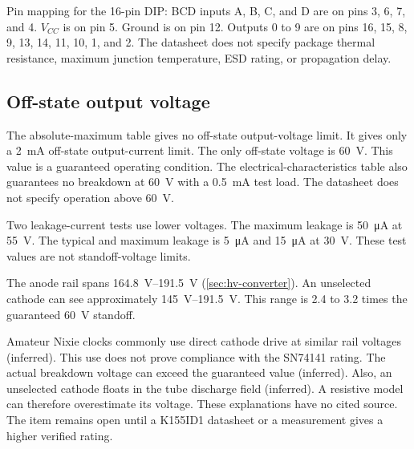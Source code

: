 Pin mapping for the 16-pin DIP: BCD inputs A, B, C, and D are on pins 3, 6, 7,
and 4. \(V_{CC}\) is on pin 5. Ground is on pin 12. Outputs 0 to 9 are on pins
16, 15, 8, 9, 13, 14, 11, 10, 1, and 2. The datasheet does not specify package
thermal resistance, maximum junction temperature, ESD rating, or propagation
delay.

\subsection{Off-state output voltage}
\label{sec:bcd-voltage-risk}

The absolute-maximum table gives no off-state output-voltage limit. It gives
only a \SI{2}{\milli\ampere} off-state output-current limit. The only off-state
voltage is \SI{60}{\volt}. This value is a guaranteed operating condition. The
electrical-characteristics table also guarantees no breakdown at
\SI{60}{\volt} with a \SI{0.5}{\milli\ampere} test load. The datasheet does not
specify operation above \SI{60}{\volt}.

Two leakage-current tests use lower voltages. The maximum leakage is
\SI{50}{\micro\ampere} at \SI{55}{\volt}. The typical and maximum leakage is
\SI{5}{\micro\ampere} and \SI{15}{\micro\ampere} at \SI{30}{\volt}. These test
values are not standoff-voltage limits.

The anode rail spans \SIrange{164.8}{191.5}{\volt}
(\cref{sec:hv-converter}). An unselected cathode can see approximately
\SIrange{145}{191.5}{\volt}. This range is 2.4 to 3.2 times the guaranteed
\SI{60}{\volt} standoff.

Amateur Nixie clocks commonly use direct cathode drive at similar rail voltages
(inferred). This use does not prove compliance with the SN74141 rating. The
actual breakdown voltage can exceed the guaranteed value (inferred). Also, an
unselected cathode floats in the tube discharge field (inferred). A resistive
model can therefore overestimate its voltage. These explanations have no cited
source. The item remains open until a K155ID1 datasheet or a measurement gives
a higher verified rating.
